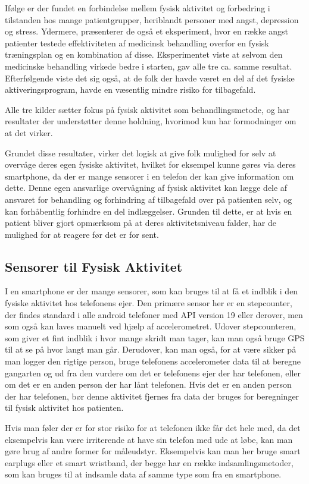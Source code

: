Ifølge \citet{book:sportPsyc} er der fundet en forbindelse mellem fysisk aktivitet og forbedring i tilstanden hos mange patientgrupper, heriblandt personer med angst, depression og stress.
Ydermere, præsenterer de også et eksperiment, hvor en række angst patienter testede effektiviteten af medicinsk behandling overfor en fysisk træningsplan og en kombination af disse.
Eksperimentet viste at selvom den medicinske behandling virkede bedre i starten, gav alle tre ca. samme resultat.
Efterfølgende viste det sig også, at de folk der havde været en del af det fysiske aktiveringsprogram, havde en væsentlig mindre risiko for tilbagefald.

Alle tre kilder sætter fokus på fysisk aktivitet som behandlingsmetode, \citet{art:physMental} og \citet{book:sportPsyc} har resultater der understøtter denne holdning, hvorimod \citet{misc:healthReports} kun har formodninger om at det virker.

Grundet disse resultater, virker det logisk at give folk mulighed for selv at overvåge deres egen fysiske aktivitet, hvilket for eksempel kunne gøres via deres smartphone, da der er mange sensorer i en telefon der kan give information om dette.
Denne egen ansvarlige overvågning af fysisk aktivitet kan lægge dele af ansvaret for behandling og forhindring af tilbagefald over på patienten selv, og kan forhåbentlig forhindre en del indlæggelser.
Grunden til dette, er at hvis en patient bliver gjort opmærksom på at deres aktivitetsniveau falder, har de mulighed for at reagere før det er for sent.

\subsection{Sensorer til Fysisk Aktivitet}
I en smartphone er der mange sensorer, som kan bruges til at få et indblik i den fysiske aktivitet hos telefonens ejer.
Den primære sensor her er en stepcounter, der findes standard i alle android telefoner med API version 19 eller derover, men som også kan laves manuelt ved hjælp af accelerometret.
Udover stepcounteren, som giver et fint indblik i hvor mange skridt man tager, kan man også bruge GPS til at se på hvor langt man går.
Derudover, kan man også, for at være sikker på man logger den rigtige person, bruge telefonens accelerometer data til at beregne gangarten \citep{4272626} og ud fra den vurdere om det er telefonens ejer der har telefonen, eller om det er en anden person der har lånt telefonen.
Hvis det er en anden person der har telefonen, bør denne aktivitet fjernes fra data der bruges for beregninger til fysisk aktivitet hos patienten.

Hvis man føler der er for stor risiko for at telefonen ikke får det hele med, da det eksempelvis kan være irriterende at have sin telefon med ude at løbe, kan man gøre brug af andre former for måleudstyr.
Eksempelvis kan man her bruge smart earplugs eller et smart wristband, der begge har en række indsamlingsmetoder, som kan bruges til at indsamle data af samme type som fra en smartphone.